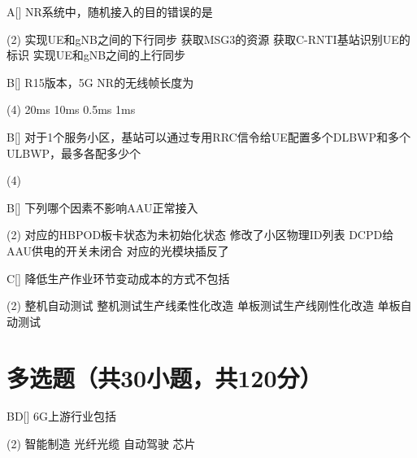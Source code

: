 \begin{choice}{A}[]
    NR系统中，随机接入的目的错误的是
    \begin{tasks}(2)
        \task 实现UE和gNB之间的下行同步
        \task 获取MSG3的资源
        \task 获取C-RNTI基站识别UE的标识
        \task 实现UE和gNB之间的上行同步
    \end{tasks}
\end{choice}


\begin{choice}{B}[]
    R15版本，5G NR的无线帧长度为
    \begin{tasks}(4)
        \task 20ms
        \task 10ms
        \task 0.5ms
        \task 1ms
    \end{tasks}
\end{choice}


\begin{choice}{B}[]
    对于1个服务小区，基站可以通过专用RRC信令给UE配置多个DLBWP和多个ULBWP，最多各配多少个
    \begin{tasks}(4)
    \end{tasks}
\end{choice}


\begin{choice}{B}[]
    下列哪个因素不影响AAU正常接入
    \begin{tasks}(2)
        \task 对应的HBPOD板卡状态为未初始化状态
        \task 修改了小区物理ID列表
        \task DCPD给AAU供电的开关未闭合
        \task 对应的光模块插反了
    \end{tasks}
\end{choice}


\begin{choice}{C}[]
    降低生产作业环节变动成本的方式不包括
    \begin{tasks}(2)
        \task 整机自动测试
        \task 整机测试生产线柔性化改造
        \task 单板测试生产线刚性化改造
        \task 单板自动测试
    \end{tasks}
\end{choice}



\section{多选题（共30小题，共120分）}

\begin{choice}{\;BD\;}[]
    6G上游行业包括
    \begin{tasks}(2)
        \task 智能制造
        \task 光纤光缆
        \task 自动驾驶
        \task 芯片
    \end{tasks}
\end{choice}

